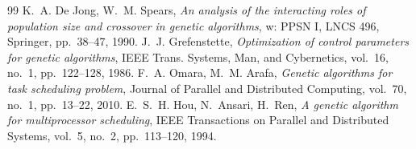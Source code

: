 \documentclass[12pt,a4paper]{article}
\begin{document}
\begin{thebibliography}{99}
 K.~A. De Jong, W.~M. Spears, \textit{An analysis of the interacting roles of population size and crossover in genetic algorithms}, w: PPSN I, LNCS 496, Springer, pp.~38--47, 1990.
 J.~J. Grefenstette, \textit{Optimization of control parameters for genetic algorithms}, IEEE Trans. Systems, Man, and Cybernetics, vol.~16, no.~1, pp.~122--128, 1986.
 F.~A. Omara, M.~M. Arafa, \textit{Genetic algorithms for task scheduling problem}, Journal of Parallel and Distributed Computing, vol.~70, no.~1, pp.~13--22, 2010.
 E.~S.~H. Hou, N.~Ansari, H.~Ren, \textit{A genetic algorithm for multiprocessor scheduling}, IEEE Transactions on Parallel and Distributed Systems, vol.~5, no.~2, pp.~113--120, 1994.
\end{thebibliography}
\end{document}
